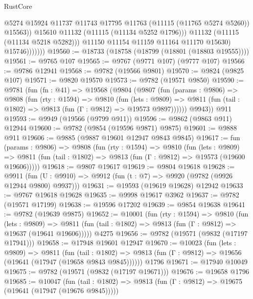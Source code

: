 \begin{lexlean}{RustCore}
\begin{coremodule}
                            @5274
                            @15924
                            @11737
                            @11743
                            @17795
                            @11763
                            (@11115 (@11765 @5274 @5260))
                            @15563))
                        @15610
                        @11132
                        (@11115 (@11134 @5252 @1796)))
                      @11132
                      (@11115 (@11134 @5218 @5282)))
                    @11150
                    @11154
                    @11159
                    @11164
                    @11170
                    @15630)
                  @15746)))))))
@19560 := @18733 (@18758 (@18799 (@18801 (@18803 @19555))))
@19561 := @9765 @107
@19565 := @9767 (@9771 @107) (@9777 @107)
@19566 := @9786 @12941
@19568 := @9782 (@19566 @9801)
@19570 := @9824 (@9825 @107)
@19571 := @9820 @19570
@19573 := @9782 (@19571 @9850)
@19590 := @9781
    (fun (fn : @41) =>
    @19568
      (@9804
        (@9807
          (fun (params : @9806) =>
          @9808
            (fun (rty : @1594) =>
            @9810
              (fun (lets : @9809) =>
              @9811 (fun (tail : @1802) => @9813 (fun (Γ : @9812) => @19573 @9897))))))
        @9943))
    @911
@19593 := @9949 (@19566 (@9799 @911))
@19596 := @9862 (@9863 @911) @12944
@19600 := @9782 (@9854 (@19596 @9871) @9875)
@19601 := @9888 @911
@19606 := @9885 (@9887 @19601 @12947 @9843 @9845)
@19617 := fun (params : @9806) =>
  @9808
    (fun (rty : @1594) =>
    @9810
      (fun (lets : @9809) =>
      @9811 (fun (tail : @1802) => @9813 (fun (Γ : @9812) => @19573 (@19600 @19606)))))
@19618 := @9807 @19617
@19619 := @9804 @19618
@19628 := @9911
    (fun (U : @9910) => @9912 (fun (t : @7) => @9920 (@9782 (@9926 @12944 @9800) @9937)))
@19631 := @19593 (@19619 @19628) @12942
@19633 := @9767 @19618 @19628
@19635 := @9998 @19617 @3962
@19637 := @9782 (@19571 @17199)
@19638 := @19596 @17202
@19639 := @9854 @19638
@19641 := @9782 (@19639 @9875)
@19652 := @10001
    (fun (rty : @1594) =>
    @9810
      (fun (lets : @9809) =>
      @9811 (fun (tail : @1802) => @9813 (fun (Γ : @9812) => @19637 (@19641 @19606)))))
    @4275
@19656 := @9782 (@19571 (@9832 (@17197 @17941)))
@19658 := @17948 @19601 @12947
@19670 := @10023
    (fun (lets : @9809) =>
    @9811
      (fun (tail : @1802) =>
      @9813 (fun (Γ : @9812) => @19656 (@19641 (@17947 (@19658 @9843 @9845))))))
    @1796
@19671 := @17940 @10049
@19675 := @9782 (@19571 (@9832 (@17197 @19671)))
@19676 := @19658 @1796
@19685 := @10047
    (fun (tail : @1802) => @9813 (fun (Γ : @9812) => @19675 (@19641 (@17947 (@19676 @9845)))))

\end{coremodule}
\end{lexlean}
